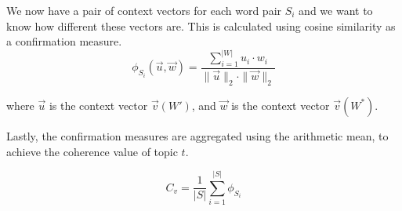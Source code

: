 We now have a pair of context vectors for each word pair $S_i$ and we want to know how different these vectors are.
This is calculated using cosine similarity as a confirmation measure.
\begin{equation}\label{eq:coherence_3}
	\phi_{S_i}(\overrightarrow{u}, \overrightarrow{w}) = \frac
	{\sum_{i = 1}^{|W|} u_i \cdot w_i}
	{\|\overrightarrow{u}\|_2 \cdot \|\overrightarrow{w}\|_2}
\end{equation}

\noindent where $\overrightarrow{u}$ is the context vector $\overrightarrow{v}(W')$, and $\overrightarrow{w}$ is the context vector $\overrightarrow{v}(W^*)$.

Lastly, the confirmation measures are aggregated using the arithmetic mean, to achieve the coherence value of topic $t$.

\begin{equation}\label{eq:coherence_4}
	C_v = \frac{1}{|S|}\sum_{i=1}^{|S|}\phi_{S_i}
\end{equation}